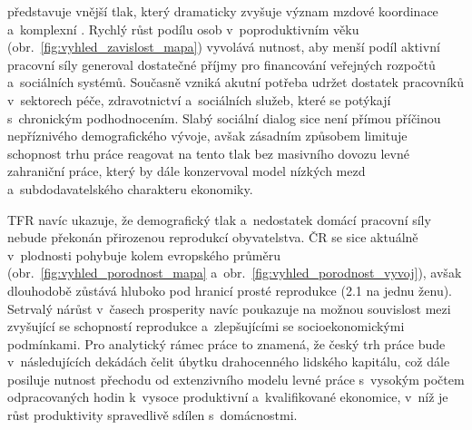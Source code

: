  představuje vnější tlak, který dramaticky zvyšuje význam mzdové koordinace a~komplexní . Rychlý růst podílu osob v~poproduktivním věku (obr.~\ref{fig:vyhled_zavislost_mapa}) vyvolává nutnost, aby menší podíl aktivní pracovní síly generoval dostatečné příjmy pro financování veřejných rozpočtů a~sociálních systémů. Současně vzniká akutní potřeba udržet dostatek pracovníků v~sektorech péče, zdravotnictví a~sociálních služeb, které se potýkají s~chronickým podhodnocením. Slabý sociální dialog sice není přímou příčinou nepříznivého demografického vývoje, avšak zásadním způsobem limituje schopnost trhu práce reagovat na tento tlak bez masivního dovozu levné zahraniční práce, který by dále konzervoval model nízkých mezd a~subdodavatelského charakteru ekonomiky.\par



\newpage
{}

\Acf{TFR} navíc ukazuje, že demografický tlak a~nedostatek domácí pracovní síly nebude překonán přirozenou reprodukcí obyvatelstva. \ac{ČR} se sice aktuálně v~plodnosti pohybuje kolem evropského průměru (obr.~\ref{fig:vyhled_porodnost_mapa} a~obr.~\ref{fig:vyhled_porodnost_vyvoj}), avšak dlouhodobě zůstává hluboko pod hranicí prosté reprodukce (\SI{2,1}{\person} na jednu ženu). Setrvalý nárůst v~časech prosperity navíc poukazuje na možnou souvislost mezi zvyšující se schopností reprodukce a~zlepšujícími se socioekonomickými podmínkami. Pro analytický rámec práce to znamená, že český trh práce bude v~následujících dekádách čelit úbytku drahocenného lidského kapitálu, což dále posiluje nutnost přechodu od extenzivního modelu levné práce s~vysokým počtem odpracovaných hodin k~vysoce produktivní a~kvalifikované ekonomice, v~níž je růst produktivity spravedlivě sdílen s~domácnostmi.\par
